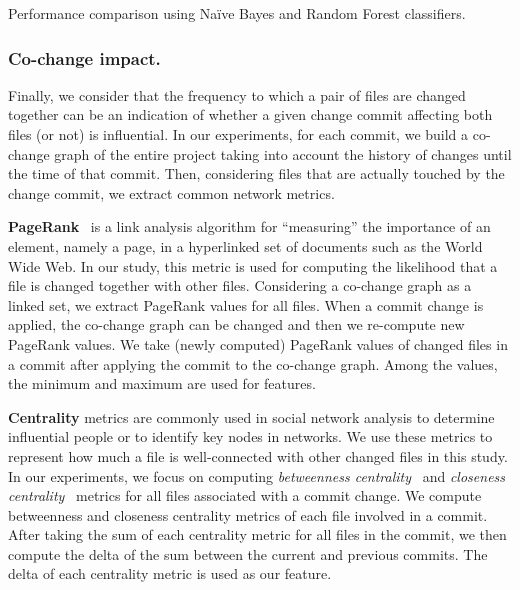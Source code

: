 

\begin{table}[!t]
    \caption{Performance comparison using Na\"{i}ve Bayes and Random Forest classifiers.}
    \label{tab:f-measure}
    
\end{table}

\subsubsection{Co-change impact.}
Finally, we consider that the frequency to which a pair of files are changed
together can be an indication of whether a given change commit affecting both
files (or not) is influential.
In our experiments, for each commit, we build a co-change graph of the entire
project taking into account the history of changes until the time of that
commit. Then, considering files that are actually touched by the
change commit, we extract common network metrics.


\textbf{PageRank}~\cite{Brin98} is a link analysis algorithm for ``measuring'' the importance of
an element, namely a page, in a hyperlinked set of documents such as the World Wide Web. In our study, this metric is used for computing the likelihood that a file is changed together with other files.
Considering a co-change graph as a linked set, we extract PageRank values for all files. When a commit change is
applied, the co-change graph can be changed and then we re-compute new PageRank values. We take (newly computed) PageRank values of changed files in a commit after applying the commit to the co-change graph. Among the values, the minimum and maximum are used for features.


\textbf{Centrality} metrics are commonly used in social network analysis to determine influential people
or to identify key nodes in networks. We use these metrics to represent how much a file is well-connected with other changed files in this study. 
In our experiments, we focus on computing 
{\it betweenness centrality}~\cite{freeman07}
and {\it closeness centrality}~\cite{Sabidussi66} metrics for all files associated with a commit change.
We compute betweenness and closeness centrality metrics of each file involved in a commit. After taking the sum of each centrality metric for all files in the commit, 
we then compute the delta of the sum between the current and previous commits. 
The delta of each centrality metric is used as our feature.

